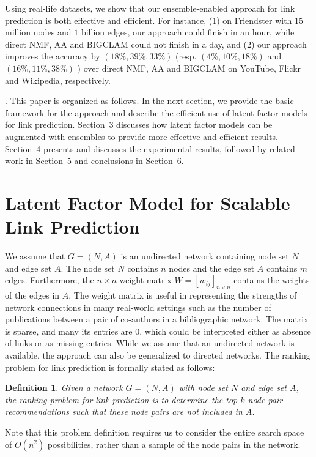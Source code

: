 \documentclass[10pt,journal,compsoc]{IEEEtran}
\newcommand{\stitle}[1]{\vspace{0.5ex}\noindent{\bf #1}}
\newcommand{\NMF}{{\sf NMF}\xspace }
\newcommand{\Aa}{{\sf AA}\xspace }
\newcommand{\BIGCLAM}{{\sf BIGCLAM}\xspace}
\newcommand{\YouTube}{{\sf YouTube}\xspace}
\newcommand{\Flickr}{{\sf Flickr}\xspace}
\newcommand{\Wikipedia}{{\sf Wikipedia}\xspace}
\newcommand{\Friendster}{{\sf Friendster}\xspace}
\newtheorem{definition}{Definition}
\begin{document}
Using real-life datasets, we show that our ensemble-enabled approach for link prediction is both effective and efficient.
For instance, (1) on \Friendster with $15$ million nodes and $1$ billion edges, our approach could finish in an
hour, while direct \NMF, \Aa \cite{adamic} and \BIGCLAM \cite{yang-wsdm2013} could not finish in a day, and
(2) our approach improves the accuracy by $(18\%, 39\%, 33\%)$ (resp. $(4\%, 10\%, 18\%)$ and $(16\%, 11\%, 38\%)$ )
over direct \NMF, \Aa and \BIGCLAM on \YouTube, \Flickr and \Wikipedia, respectively.


\stitle{Organization}. This paper is organized as follows. In the next section, we  provide
the basic framework for the approach and describe the efficient use
of  latent factor models for link prediction. Section~3 discusses
how latent factor models can be augmented with ensembles to provide
more effective and efficient results. Section~4 presents and discusses the
experimental results, followed by related work in Section~5 and conclusions in Section~6.



\section{Latent Factor Model for Scalable Link Prediction}
\label{sec-NMF}

We assume that $G=(N, A)$ is an undirected network containing node set $N$ and
edge set $A$. The node set $N$ contains $n$ nodes and the edge set
$A$ contains $m$ edges. Furthermore, the $n \times n$ weight matrix
$W= [w_{ij}]_{n\times n}$ contains the weights of the edges in $A$.
The weight matrix is useful in representing the strengths of network
connections in  many real-world settings such as the number of
publications between a pair of co-authors in a bibliographic
network.  The matrix is sparse, and many its entries are 0, which could be
interpreted either as absence of links or as missing entries. While
we assume that an undirected network is available, the approach can
also be generalized to directed networks. The ranking problem for
link prediction is formally stated as follows:
\begin{definition}
Given a network $G=(N, A)$ with node set $N$ and edge set $A$, the ranking problem for link
prediction is to determine the top-$k$ node-pair recommendations such that these node pairs are not included in $A$.
\end{definition}
Note that this problem definition requires us to consider the entire
search space of $O(n^2)$ possibilities, rather than a sample of the
node pairs in the network.
\end{document}
